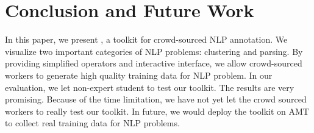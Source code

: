\section{Conclusion and Future Work}
In this paper, we present \sys, a toolkit for crowd-sourced NLP annotation. We visualize two important categories of NLP problems: clustering and parsing. By providing simplified operators and interactive interface, we allow crowd-sourced workers to generate high quality training data for NLP problem. In our evaluation, we let non-expert student to test our toolkit. The results are very promising. Because of the time limitation, we have not yet let the crowd sourced workers to really test our toolkit. In future, we would deploy the toolkit on AMT to collect real training data for NLP problems. 








